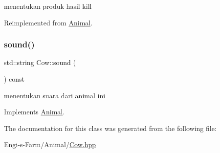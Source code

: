 menentukan produk hasil kill 

Reimplemented from \mbox{\hyperlink{class_animal_a4d4e70aed7f889574600e8492f419948}{Animal}}.

\mbox{\label{class_cow_a31d7c184a971dccda54fdf098c5f0460}} 
\subsubsection{\texorpdfstring{sound()}{sound()}}
{\footnotesize\ttfamily std\+::string Cow\+::sound (\begin{DoxyParamCaption}{ }\end{DoxyParamCaption}) const\hspace{0.3cm}{\ttfamily [virtual]}}

menentukan suara dari animal ini 

Implements \mbox{\hyperlink{class_animal_aca8216576b21b87f761a34686a4968a8}{Animal}}.



The documentation for this class was generated from the following file\+:\begin{DoxyCompactItemize}
\item 
Engi-\/s-\/\+Farm/\+Animal/\mbox{\hyperlink{_cow_8hpp}{Cow.\+hpp}}\end{DoxyCompactItemize}
